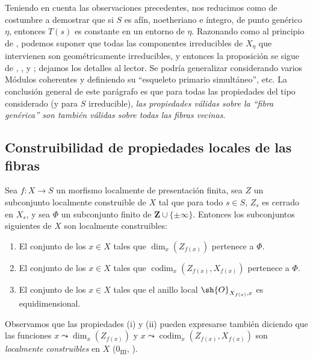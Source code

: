 \begin{remark}[9.8.9]
\medskip
Teniendo en cuenta las observaciones precedentes, nos reducimos como de costumbre a demostrar que si $S$ es afín, noetheriano e íntegro, de punto genérico $\eta$, entonces $T(s)$ es constante en un entorno de $\eta$.
Razonando como al principio de , podemos suponer que todas las componentes irreducibles de $X_\eta$ que intervienen son geométricamente irreducibles, y entonces la proposición se sigue de , ,  y ; dejamos los detalles al lector.
Se podría generalizar considerando varios Módulos coherentes y definiendo su ``esqueleto primario simultáneo'', etc.
La conclusión general de este parágrafo es que para todas las propiedades del tipo considerado (y para $S$ irreducible), \emph{las propiedades válidas sobre la ``fibra genérica'' son también válidas sobre todas las fibras vecinas}.
\end{remark}

\subsection{Construibilidad de propiedades locales de las fibras}
\label{subsection:IV.9.9}
\label{IV.9.9}

\begin{proposition}[9.9.1]
\label{IV.9.9.1}
Sea $f:X\to S$ un morfismo localmente de presentación finita, sea $Z$ un subconjunto localmente construible de $X$ tal que para todo $s\in S$, $Z_s$ es cerrado en $X_s$, y sea $\Phi$ un subconjunto finito de $\mathbf{Z}\cup\{\pm\infty\}$.
Entonces los subconjuntos siguientes de $X$ son localmente construibles:
\begin{enumerate}[label=\textup{(\roman*)}]
  \item El conjunto de los $x\in X$ tales que $\dim_x(Z_{f(x)})$ pertenece a $\Phi$.
  \item El conjunto de los $x\in X$ tales que $\operatorname{codim}_x(Z_{f(x)},X_{f(x)})$ pertenece a $\Phi$.
  \item El conjunto de los $x\in X$ tales que el anillo local $\sh{O}_{X_{f(x)},x}$ es equidimensional.
\end{enumerate}

Observamos que las propiedades (i) y (ii) pueden expresarse también diciendo que las funciones $x\leadsto\dim_x(Z_{f(x)})$ y $x\leadsto\operatorname{codim}_x(Z_{f(x)},X_{f(x)})$ son \emph{localmente construibles} en $X$ ($0_{\mathrm{III}}$, ).
\end{proposition}

